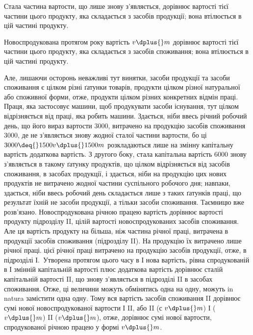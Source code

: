
Стала частина вартости, що лише знову з’являється, дорівнює вартості
тієї частини цього продукту, яка складається з засобів продукції;
вона втілюється в цій частині продукту.

Новоспродукована протягом року вартість \deq{} $v \dplus{} m$ дорівнює вартості
тієї частини цього продукту, яка складається з засобів споживання;
вона втілюється в цій частині продукту.

Але, лишаючи осторонь неважливі тут винятки, засоби продукції та
засоби споживання є цілком різні ґатунки товарів, продукти цілком різної
натуральної або споживної форми, отже, продукти цілком різних конкретних
відмін праці. Праця, яка застосовує машини, щоб продукувати
засоби існування, тут цілком відрізняється від праці, яка робить машини.
Здається, ніби ввесь річний робочий день, що його вираз вартости \deq{} 3000,
витрачено на продукцію засобів споживання \deq{} 3000, де не з’являється
знову жодної сталої частини вартости, бо ці $3000 \deq{} 1500 v \dplus{} 1500 m$
розкладаються лише на змінну капітальну вартість \dplus{} додаткова вартість. З
другого боку, стала капітальна вартість \deq{} 6000 знову з’являється в такому
ґатунку продуктів, що цілком відрізняється від засобів споживання,
в засобах продукції, і здається, ніби на продукцію цих нових продуктів
не витрачено жодної частини суспільного робочого дня; навпаки, здається,
ніби ввесь робочий день складається лише з таких ґатунків праці, що
результат їхній не засоби продукції, а тільки засоби споживання. Таємницю
вже розв’язано. Новоспродукована річною працею вартість дорівнює
вартості продукту підрозділу II, цілій вартості новоспродукованих засобів
споживання. Але ця вартість продукту на  більша, ніж частина річної
праці, витрачена в продукції засобів споживання (підрозділу II). На продукцію
їх витрачено лише  річної праці.  цієї річної праці витрачено
на продукцію засобів продукції, отже, в підрозділі І.~Утворена протягом
цього часу в І нова вартість, рівна спродукованій в І змінній капітальній
вартості плюс додаткова вартість дорівнює сталій капітальній вартості II,
що знову з’являється в підрозділі II в засобах споживання. Отже, ці величини
можуть обмінятись одна на одну, можуть in natura замістити одна одну.
Тому вся вартість засобів споживання II дорівнює сумі нової новоспродукованої
вартости І \dplus{} II, або II ($с$ \dplus{} $v \dplus{} m$) \deq{} І ($v \dplus{} m$) \dplus{} II ($v \dplus{} m$), отже, дорівнює
сумі нової вартости, спродукованої річною працею у формі $v \dplus{} m$.

